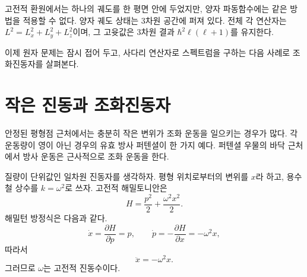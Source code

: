 
고전적 환원에서는 하나의 궤도를 한 평면 안에 두었지만, 양자 파동함수에는 같은 방법을 적용할 수 없다. 양자 궤도 상태는 3차원 공간에 퍼져 있다. 전체 각 연산자는 \(L^2=L_x^2+L_y^2+L_z^2\)이며, 그 고윳값은 3차원 결과 \(\hbar^2\ell(\ell+1)\)를 유지한다.

\begin{classroomqa}\end{classroomqa}

\begin{classroomqa}\end{classroomqa}

이제 원자 문제는 잠시 접어 두고, 사다리 연산자로 스펙트럼을 구하는 다음 사례로 조화진동자를 살펴본다.

\section{작은 진동과 조화진동자}

안정된 평형점 근처에서는 충분히 작은 변위가 조화 운동을 일으키는 경우가 많다. 각운동량이 영이 아닌 경우의 유효 방사 퍼텐셜이 한 가지 예다. 퍼텐셜 우물의 바닥 근처에서 방사 운동은 근사적으로 조화 운동을 한다.

질량이 단위값인 일차원 진동자를 생각하자. 평형 위치로부터의 변위를 \(x\)라 하고, 용수철 상수를 \(k=\omega^2\)로 쓰자. 고전적 해밀토니안은
\begin{equation}
H=\frac{p^2}{2}+\frac{\omega^2x^2}{2}.
\end{equation}
해밀턴 방정식은 다음과 같다.
\begin{equation}
\dot{x}=\frac{\partial H}{\partial p}=p,
\qquad
\dot{p}=-\frac{\partial H}{\partial x}=-\omega^2x,
\end{equation}
따라서
\begin{equation}
\ddot{x}=-\omega^2x.
\end{equation}
그러므로 \(\omega\)는 고전적 진동수이다.


